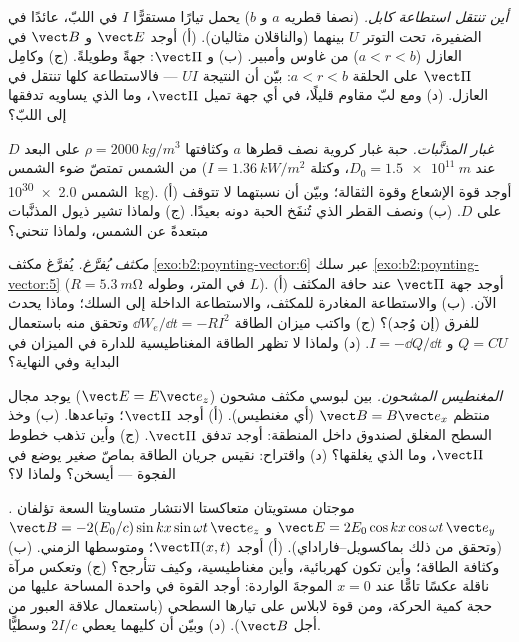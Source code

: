\begin{exercise}[$\star\star$]\label{exo:b2:poynting-vector:8}
\emph{أين تنتقل استطاعة كابل.}  (نصفا قطريه $a$
و $b$) يحمل تيارًا مستقرًّا $I$ في اللبّ، عائدًا في الضفيرة، تحت
التوتر $U$ بينهما (والناقلان مثاليان). (أ) أوجد $\vect E$ و $\vect B$
في العازل ($a < r < b$) من غاوس وأمبير. (ب) و $\vect\Pi$:
جهةً وطويلةً. (ج) وكامِل $\vect\Pi$ على الحلقة $a < r
< b$: بيّن أن النتيجة $UI$ --- فالاستطاعة كلها تنتقل في
العازل. (د) ومع لبّ مقاوم قليلًا، في أي جهة تميل
$\vect\Pi$، وما الذي يساويه تدفقها إلى اللبّ؟
\end{exercise}

\begin{exercise}[$\star\star$]\label{exo:b2:poynting-vector:9}
\emph{غبار المذنَّبات.} حبة غبار كروية نصف قطرها $a$ وكثافتها
$\rho = \qty{2000}{kg/m^3}$ على البعد $D$ من الشمس تمتصّ
ضوء الشمس ($I = \qty{1.36}{kW/m^2}$ عند $D_0 = \qty{1.5e11}{m}$، وكتلة الشمس
\qty{2.0e30}{kg}). (أ) أوجد قوة الإشعاع وقوة الثقالة؛ وبيّن أن
نسبتهما لا تتوقف على $D$. (ب) ونصف القطر الذي تُنفَخ الحبة دونه
بعيدًا. (ج) ولماذا تشير ذيول المذنَّبات مبتعدةً عن الشمس، ولماذا
تنحني؟
\end{exercise}

\begin{exercise}[$\star\star\star$]\label{exo:b2:poynting-vector:10}
\emph{مكثف يُفرَّغ.} يُفرَّغ مكثف
\cref{exo:b2:poynting-vector:6} عبر سلك
\cref{exo:b2:poynting-vector:5} ($R = \qty{5.3}{m\ohm}$ في المتر، وطوله
$L$). (أ) أوجد جهة $\vect\Pi$ عند حافة المكثف الآن. (ب) والاستطاعة
المغادرة للمكثف، والاستطاعة الداخلة إلى السلك؛ وماذا يحدث
للفرق (إن وُجد)؟ (ج) واكتب ميزان الطاقة $\dd W_e/\dd t = -RI^2$
وتحقق منه باستعمال $Q = CU$ و $I = -\dd Q/\dd t$. (د) ولماذا لا تظهر
الطاقة المغناطيسية للدارة في الميزان في
البداية وفي النهاية؟
\end{exercise}

\begin{exercise}[$\star\star\star$]\label{exo:b2:poynting-vector:11}
\emph{المغنطيس المشحون.} بين لبوسي مكثف مشحون
($\vect E = E\vect e_z$) يوجد مجال منتظم $\vect B = B\vect e_x$ (أي مغنطيس).
(أ) أوجد $\vect\Pi$؛ وتباعدها. (ب) وخذ السطح المغلق لصندوق
داخل المنطقة: أوجد تدفق $\vect\Pi$. (ج) وأين تذهب خطوط $\vect\Pi$،
وما الذي يغلقها؟ (د) واقتراح: نقيس جريان الطاقة
بماصّ صغير يوضع في الفجوة --- أيسخن؟ ولماذا لا؟
\end{exercise}

\begin{exercise}[$\star\star\star$]\label{exo:b2:poynting-vector:12}
\emph{.} موجتان مستويتان متعاكستا الانتشار متساويتا
السعة تؤلفان $\vect E = 2E_0\cos kx\cos\omega t\,\vect e_y$ و $\vect B = -2(E_0/c)
\sin kx\sin\omega t\,\vect e_z$ (وتحقق من ذلك بماكسويل--فاراداي). (أ) أوجد
$\vect\Pi(x, t)$؛ ومتوسطها الزمني. (ب) وكثافة الطاقة؛ وأين تكون
كهربائية، وأين مغناطيسية، وكيف تتأرجح؟ (ج) وتعكس مرآة ناقلة
عكسًا تامًّا عند $x = 0$ الموجةَ الواردة: أوجد القوة في واحدة
المساحة عليها من حجة كمية الحركة، ومن قوة لابلاس على
تيارها السطحي (باستعمال علاقة العبور من أجل $\vect B$). (د) وبيّن
أن كليهما يعطي $2I/c$ وسطيًّا.
\end{exercise}

